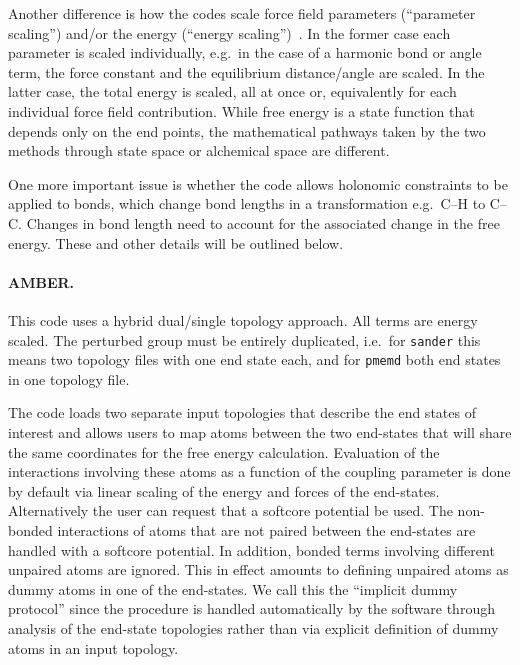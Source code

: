 \documentclass[journal=jctcce,manuscript=article]{achemso}
\newcommand{\progname}[1]{\texttt{#1}}
\begin{document}
Another difference is how the codes scale force field parameters (``parameter 
scaling'') and/or the energy (``energy 
scaling'')~\cite{doi:10.1021/jp981628n}.  In the former case each parameter is 
scaled individually, e.g.\ in the case of a harmonic bond or angle term,
the force constant and the equilibrium distance/angle are scaled. In the 
latter case, the total energy is scaled, all at once or, equivalently for each 
individual force field contribution.  While free energy is a state function that
depends only on the end points, the mathematical pathways taken by the two methods through state space 
or alchemical space are different.  

One more important issue is whether the code allows holonomic constraints to be applied 
to bonds, which change bond lengths in a transformation e.g.\ C--H to C--C.  
Changes in bond length need to account for the associated change in the free 
energy.  These and other details will be outlined below.

\paragraph{AMBER.}
This code uses a hybrid dual/single topology approach.  All terms are energy scaled. 
The perturbed group must be entirely duplicated, i.e.\ for 
\progname{sander} this means two topology files with one end state each, and for \progname{pmemd} both end states in one topology file. 

 The code loads two separate input topologies that describe the end states of interest and allows users to map atoms between the two end-states that will share the same coordinates for the free energy calculation. Evaluation of the interactions involving these atoms as a function of the coupling parameter is done by default via  linear scaling of the energy and forces of the end-states. Alternatively the user can request that a softcore potential be used. The non-bonded interactions of atoms that are not paired between the end-states are handled with a softcore potential. In addition, bonded terms involving different unpaired atoms are ignored. This in effect amounts to defining unpaired atoms as dummy atoms in one of the end-states. We call this the ``implicit dummy protocol'' since the procedure is handled automatically by the software through analysis of the end-state topologies rather than via explicit definition of dummy atoms in an input topology. 
\end{document}

